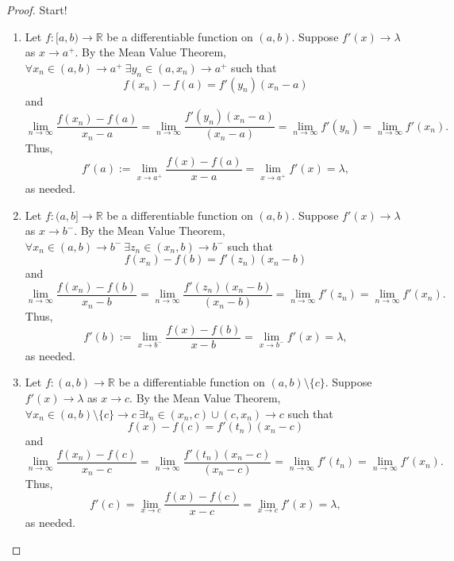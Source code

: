 \documentclass[12pt]{article}
\theoremstyle{definition}
\begin{document}
\begin{proof}
    Start!
    \begin{enumerate}[label=(\alph*)]
        \item Let \(f : [a, b) \to \mathbb{R}\) be a differentiable function on \((a, b)\). Suppose \(f'(x) \to \lambda\) as \(x \to a^{+}\). By the Mean Value Theorem, \(\forall x_n \in (a, b) \to a^{+}\ \exists y_n \in (a, x_n) \to a^{+}\) such that
        \[
            f(x_n) - f(a) = f'(y_n)(x_n - a)
        \]
        and
        \[
            \lim_{n \to \infty}\frac{f(x_n) - f(a)}{x_n - a} = \lim_{n \to \infty}\frac{f'(y_n)(x_n - a)}{(x_n - a)} = \lim_{n \to \infty}f'(y_n) = \lim_{n \to \infty}f'(x_n).
        \]
        Thus,
        \[
            f'(a) := \lim_{x \to a^{+}}\frac{f(x) - f(a)}{x - a} = \lim_{x \to a^{+}}f'(x) = \lambda,
        \]
        as needed.
        \item Let \(f : (a, b] \to \mathbb{R}\) be a differentiable function on \((a, b)\). Suppose \(f'(x) \to \lambda\) as \(x \to b^{-}\). By the Mean Value Theorem, \(\forall x_n \in (a, b) \to b^{-} \ \exists z_n \in (x_n, b) \to b^{-}\) such that 
        \[
            f(x_n) - f(b) = f'(z_n)(x_n - b)
        \]
        and
        \[
            \lim_{n \to \infty}\frac{f(x_n) - f(b)}{x_n - b} = \lim_{n \to \infty}\frac{f'(z_n)(x_n - b)}{(x_n - b)} = \lim_{n \to \infty}f'(z_n) = \lim_{n \to \infty}f'(x_n).
        \]
        Thus,
        \[
            f'(b) := \lim_{x \to b^{-}}\frac{f(x) - f(b)}{x - b} = \lim_{x \to b^{-}}f'(x) = \lambda,
        \]
        as needed.
        \item Let \(f : (a, b) \to \mathbb{R}\) be a differentiable function on \((a, b) \setminus \{c\}\). Suppose \(f'(x) \to \lambda\) as \(x \to c\). By the Mean Value Theorem, \(\forall x_n \in (a, b) \setminus \{c\} \to c \ \exists t_n \in (x_n, c) \cup (c, x_n) \to c\) such that
        \[
            f(x) - f(c) = f'(t_n)(x_n - c)
        \]
        and
        \[
            \lim_{n \to \infty}\frac{f(x_n) - f(c)}{x_n - c} = \lim_{n \to \infty}\frac{f'(t_n)(x_n - c)}{(x_n - c)} = \lim_{n \to \infty}f'(t_n) = \lim_{n \to \infty}f'(x_n).
        \]
        Thus,
        \[
            f'(c) = \lim_{x \to c}\frac{f(x) - f(c)}{x - c} = \lim_{x \to c}f'(x) = \lambda,
        \]
        as needed.
    \end{enumerate}
\end{proof}
\end{document}
